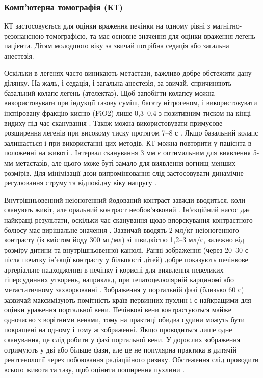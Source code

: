 \subsubsection{Комп’ютерна томографія (КТ)} 

КТ застосовується для оцінки враження печінки на одному рівні з магнітно-резонансною томографією, та має основне значення для оцінки враження легень пацієнта. Дітям молодшого віку за звичай потрібна седація або загальна анестезія.

Оскільки в легенях часто виникають метастази, важливо добре обстежити дану ділянку. На жаль, і седація, і загальна анестезія, за звичай, спричиняють базальний колапс легень (ателектаз).  Щоб запобігти колапсу можна використовувати при індукції газову суміш, багату нітрогеном, і використовувати інспіровану фракцію кисню (FiO2) лише 0,3–0,4 з позитивним тиском на кінці видиху під час сканування \cite{pmid16651244}. Також можна використовувати примусове розширення легенів при високому тиску протягом 7–8 с \cite{pmid15285242}. Якщо базальний колапс залишається і при використанні цих методів, КТ можна повторити у пацієнта в положенні на животі \cite{pmid16712615}.
Інтервал сканування 3 мм є оптимальним для виявлення 5-мм метастазів, але цього може буті замало для виявлення вогнищ менших розмірів. Для мінімізації дози випромінювання слід застосовувати динамічне регулювання струму та відповідну віку напругу \cite{pmid16794509}.

Внутрішньовенний неіоногенний йодований контраст завжди вводиться, коли сканують живіт, але оральний контраст необов’язковий \cite{pmid17208562}. Ін'єкційний насос дає найкращі результати, оскільки час сканування щодо впорскування контрастного болюсу має вирішальне значення \cite{pmid16794509}. Зазвичай вводять 2 мл/кг неіоногенного контрасту (із вмістом йоду 300 мг/мл) зі швидкістю 1,2–3 мл/с, залежно від розміру дитини та внутрішньовенної канюлі. Ранні зображення (через 20–30 с після початку ін’єкції контрасту у більшості дітей) добре показують печінкове артеріальне надходження в печінку і корисні для виявлення невеликих гіперсудинних утворень, наприклад, при гепатоцелюлярній карциномі або метастатичному захворюванні \cite{pmid17430157}. Зображення у портальній фазі (близько 60 с) зазвичай максимізують помітність країв первинних пухлин і є найкращими для оцінки ураження портальної вени. Печінкові вени контрастуються майже одночасно з ворітними венами, тому на практиці обидва судини можуть бути покращені на одному і тому ж зображенні. Якщо проводиться лише одне сканування, це слід робити у фазі портальної вени. У дорослих зображення отримують у дві або більше фази, але це не популярна практика в дитячій рентгенології через побоювання радіаційного ризику. Обстеження слід проводити всього живота та тазу, щоб оцінити поширення пухлини \cite{pmid17208562}.

